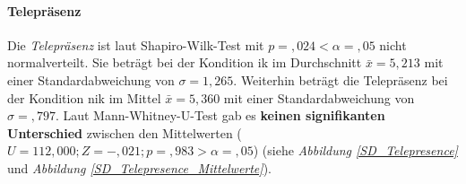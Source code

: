 \documentclass[a4paper,11pt]{article}%
\renewcommand{\\}{\vspace*{0.5\baselineskip} \newline}
\begin{document}
{\newpage

\paragraph{Telepräsenz} 
Die \textit{Telepräsenz} ist laut Shapiro-Wilk-Test mit $p =,024 < \alpha = ,05$ nicht normalverteilt. 
Sie beträgt bei der Kondition \ac{ik} im Durchschnitt $\bar{x} = 5,213$ mit einer Standardabweichung von $\sigma = 1,265$.
Weiterhin beträgt die Telepräsenz bei der Kondition \ac{nik} im Mittel $\bar{x} = 5,360$ mit einer Standardabweichung von $\sigma =,797$. 
Laut Mann-Whitney-U-Test gab es \textbf{keinen signifikanten Unterschied} zwischen den Mittelwerten ($U = 112,000; Z = -,021; p =,983 > \alpha = ,05$) (siehe \textit{Abbildung \ref{SD_Telepresence}} und \textit{Abbildung \ref{SD_Telepresence_Mittelwerte}}).

}
\end{document}
